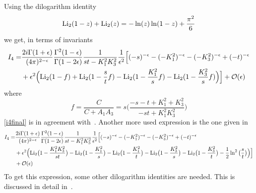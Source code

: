 \fi
Using the dilogarithm identity
\begin{equation}
\mathrm{Li}_2(1-z) +\mathrm{Li}_2(z) = -\ln(z)\ln(1-z) + \frac{\pi^2}{6}
\end{equation}
we get, in terms of invariants
\begin{equation}\label{i4final}
\begin{split}
I_4 = &\frac{2i\Gamma(1+\epsilon)}{(4\pi)^{2-\epsilon}}\frac{ \Gamma^2(1-\epsilon)}{\Gamma(1-2\epsilon)}\frac{1}{st-K_1^2K_3^2}\frac{1}{\epsilon^2}
\Big[
(-s)^{-\epsilon} - (-K_1^2)^{-\epsilon} - (-K_3^2)^{-\epsilon} + (-t)^{-\epsilon}
\\&
+\epsilon^2\Big(
\mathrm{Li}_2(1-f) + \mathrm{Li}_2(1-\frac{s}{t}f) - \mathrm{Li}_2(1-\frac{K_1^2}{s}f) - \mathrm{Li}_2(1-\frac{K_3^2}{s}f)
\Big)
\Big]
+\mathcal{O}(\epsilon)
\end{split}
\end{equation}
where
\begin{equation}
f=\frac{C}{C+A_1A_3} = s\Big( \frac{-s-t + K_1^2 + K_3^2}{-st + K_1^2K_3^2}\Big)
\end{equation}
\cref{i4final} is in agreement with~\cite{Duplancic:2000sk}. 
Another more used expression is the one given in~\cite{Bern:1993kr}
\begin{equation}\label{i4bdk}
\begin{split}
I_4 = &\frac{2i\Gamma(1+\epsilon)}{(4\pi)^{2-\epsilon}}\frac{ \Gamma^2(1-\epsilon)}{\Gamma(1-2\epsilon)}\frac{1}{st-K_1^2K_3^2}\frac{1}{\epsilon^2}
\Big[
(-s)^{-\epsilon} - (-K_1^2)^{-\epsilon} - (-K_3^2)^{-\epsilon} + (-t)^{-\epsilon}
\\&
+\epsilon^2\Big(
\mathrm{Li}_2\big(1-\frac{K_1^2K_3^2}{st}\big) 
-\mathrm{Li}_2\big(1-\frac{K_1^2}{s}\big) 
-\mathrm{Li}_2\big(1-\frac{K_1^2}{t}\big) 
-\mathrm{Li}_2\big(1-\frac{K_3^2}{s}\big) 
-\mathrm{Li}_2\big(1-\frac{K_3^2}{t}\big) 
-\frac{1}{2}\ln^2\big(\frac{s}{t}\big)
\Big)
\Big]
\\ &
+\mathcal{O}(\epsilon)
\end{split}
\end{equation}
To get this expression, some other dilogarithm identities are needed.
This is discussed in detail in~\cite{Duplancic:2000sk}.
%
%
%
\iffalse %
